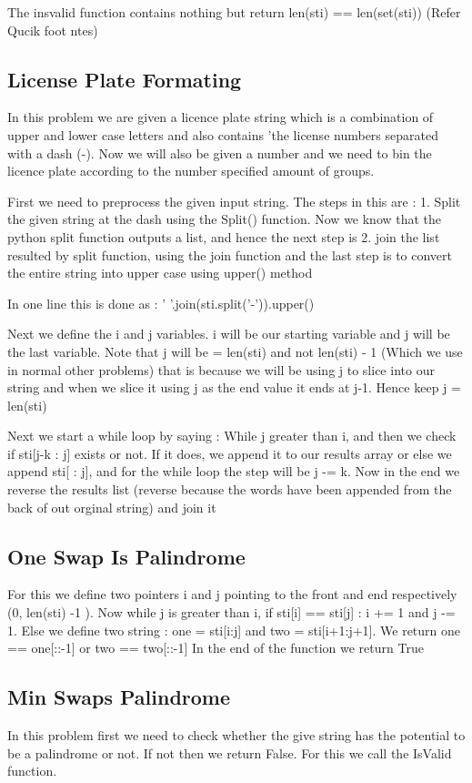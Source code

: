 \documentclass{article}
\newcommand{\nd}{\noindent}
\begin{document}
\nd The insvalid function contains nothing but return len(sti) == len(set(sti)) (Refer Qucik foot ntes)

\subsection{License Plate Formating}
In this problem we are given a licence plate string which is a combination of upper and lower case letters and also contains 'the license numbers separated with a dash (-). Now we will also be given a number and we need to bin the licence plate according to the number specified amount of groups. 

\nd First we need to preprocess the given input string. The steps in this are : 1. Split the given string at the dash using the Split() function. Now we know that the python split function outputs a list, and hence the next step is 2. join the list resulted by split function, using the join function and the last step is to convert the entire string into upper case using upper() method 

\nd In one line this is done as : ' '.join(sti.split('-')).upper()

\nd Next we define the i and j variables. i will be our starting variable and j will be the last variable. Note that j will be = len(sti) and not len(sti) - 1 (Which we use in normal other problems) that is because we will be using j to slice into our string and when we slice it using j as the end value it ends at j-1. Hence keep j = len(sti)

\nd Next we start a while loop by saying : While j greater than i, and then we check if sti[j-k : j] exists or not. If it does, we append it to our results array or else we append sti[ : j], and for the while loop the step will be j -= k. Now in the end we reverse the results list (reverse because the words have been appended from the back of out orginal string) and join it 

\subsection{One Swap Is Palindrome}
For this we define two pointers i and j pointing to the front and end respectively (0, len(sti) -1 ). Now while j is greater than i, if sti[i] == sti[j] : i += 1 and j -= 1. Else we define two string : one = sti[i:j] and two = sti[i+1:j+1]. We return one == one[::-1] or two == two[::-1] In the end of the function we return True 

\subsection{Min Swaps Palindrome}
In this problem first we need to check whether the give string has the potential to be a palindrome or not. If not then we return False. For this we call the IsValid function. 
\end{document}
